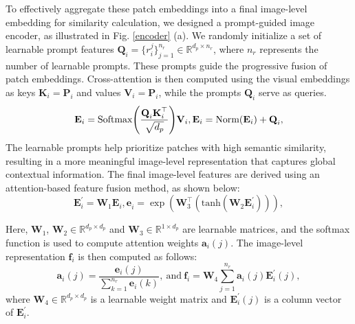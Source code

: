 To effectively aggregate these patch embeddings into a final image-level embedding for similarity calculation, we designed a prompt-guided image encoder, as illustrated in Fig. \ref{encoder} (a).
We randomly initialize a set of learnable prompt features $\textbf{Q}_{i}=\{r_{i}^{j}\}_{j=1}^{n_{r}} \in \mathbb{R}^{d_p \times n_r}$, where $n_{r}$ represents the number of learnable prompts. 
These prompts guide the progressive fusion of patch embeddings. 
Cross-attention is then computed using the visual embeddings as keys $\textbf{K}_{i}=\textbf{P}_i$ and values $\textbf{V}_{i}=\textbf{P}_i$, while the prompts $\textbf{Q}_{i}$ serve as queries.
\begin{equation}
\textbf{E}_{i}=\textrm{Softmax} \Bigg( \frac{\textbf{Q}_{i}\textbf{K}_{i}^\top}{\sqrt{d_{p}}}\Bigg)\textbf{V}_{i},\\
\textbf{E}_{i}=\textrm{Norm}(\textbf{E}_{i})+\textbf{Q}_i,
\label{eqn2}
\end{equation}
\noindent The learnable prompts help prioritize patches with high semantic similarity, resulting in a more meaningful image-level representation that captures global contextual information. 
The final image-level features are derived using an attention-based feature fusion method, as shown below:
\begin{equation}
\textbf{E}^{'}_{i}=\textbf{W}_{1}\textbf{E}_{i},\textbf{e}^{}_{i}=\exp(\textbf{W}_{3}^{\top}(\textrm{tanh}(\textbf{W}_{2}\textbf{E}^{'}_{i}))),
\end{equation}

\noindent Here, $\textbf{W}_{1}$, $\textbf{W}_{2} \in \mathbb{R}^{d_p\times d_p}$ and $\textbf{W}_{3 }\in \mathbb{R}^{1\times d_p}$ are learnable matrices, and the softmax function is used to compute attention weights  $\textbf{a}_i(j)$. 
The image-level representation $\textbf{f}_{i}$ is then computed as follows:
\begin{equation}
\textbf{a}_i(j)=\frac{\textbf{e}_i(j)}{\sum_{k=1}^{n_r} \textbf{e}_i(k)},~\textrm{and}~\textbf{f}_{i}=\textbf{W}_{4} \sum_{j=1}^{n_{r}}\textbf{a}_i(j)\textbf{E}^{'}_{i}(j),
\end{equation}
\noindent where $\textbf{W}_{4}\in \mathbb{R}^{d_{p} \times d_p}$ is a learnable weight matrix and $\textbf{E}^{'}_{i}(j)$ is a column vector of $\textbf{E}^{'}_{i}$.


